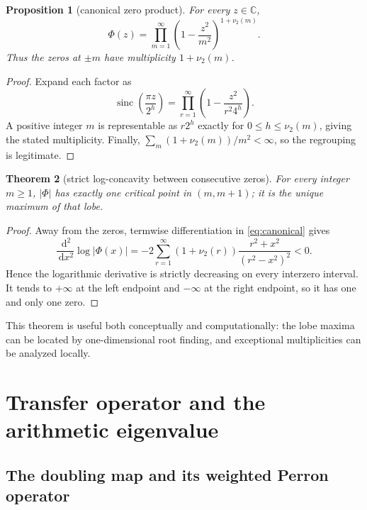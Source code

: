 \documentclass[11pt,oneside]{article}
\newtheorem{theorem}{Theorem}[section]
\newtheorem{proposition}[theorem]{Proposition}
\theoremstyle{definition}
\theoremstyle{remark}
\newcommand{\C}{\mathbb C}
\newcommand{\dd}{\,\mathrm d}
\newcommand{\sinc}{\operatorname{sinc}}
\newcommand{\vtwo}{\nu_2}
\begin{document}
\begin{proposition}[canonical zero product]
\label{prop:canonical}
For every \(z\in\C\),
\begin{equation}
 \Phi(z)=\prod_{m=1}^{\infty}
 \left(1-\frac{z^2}{m^2}\right)^{1+\vtwo(m)}.
 \label{eq:canonical}
\end{equation}
Thus the zeros at \(\pm m\) have multiplicity \(1+\vtwo(m)\).
\end{proposition}

\begin{proof}
Expand each factor as
\[
 \sinc\!\left(\frac{\pi z}{2^h}\right)
 =\prod_{r=1}^{\infty}\left(1-\frac{z^2}{r^2 4^h}\right).
\]
A positive integer \(m\) is representable as \(r2^h\) exactly for
\(0\le h\le\vtwo(m)\), giving the stated multiplicity.  Finally,
\(\sum_m(1+\vtwo(m))/m^2<\infty\), so the regrouping is legitimate.
\end{proof}

\begin{theorem}[strict log-concavity between consecutive zeros]
\label{thm:one-peak}
For every integer \(m\ge1\), \(|\Phi|\) has exactly one critical point in
\((m,m+1)\); it is the unique maximum of that lobe.
\end{theorem}

\begin{proof}
Away from the zeros, termwise differentiation in \eqref{eq:canonical} gives
\begin{equation}
 \frac{\dd^2}{\dd x^2}\log|\Phi(x)|
 =-2\sum_{r=1}^{\infty}(1+\vtwo(r))
 \frac{r^2+x^2}{(r^2-x^2)^2}<0.
 \label{eq:strict-log-concavity}
\end{equation}
Hence the logarithmic derivative is strictly decreasing on every interzero
interval.  It tends to \(+\infty\) at the left endpoint and \(-\infty\) at
the right endpoint, so it has one and only one zero.
\end{proof}

This theorem is useful both conceptually and computationally: the lobe maxima
can be located by one-dimensional root finding, and exceptional multiplicities
can be analyzed locally.

\section{Transfer operator and the arithmetic eigenvalue}
\label{sec:transfer}

\subsection{The doubling map and its weighted Perron operator}
\end{document}
